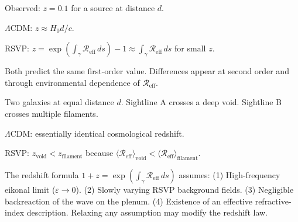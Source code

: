 \begin{WorkedExample}
  Observed: $z = 0.1$ for a source at distance $d$.

  $\Lambda$CDM: $z \approx H_0 d/c$.

  RSVP: $z = \exp(\int_\gamma \mathcal{R}_{\mathrm{eff}}\,ds) - 1
  \approx \int_\gamma\mathcal{R}_{\mathrm{eff}}\,ds$
  for small $z$.

  Both predict the same first-order value.
  Differences appear at second order and through environmental
  dependence of $\mathcal{R}_{\mathrm{eff}}$.
\end{WorkedExample}

\begin{WorkedExample}
  Two galaxies at equal distance $d$.
  Sightline A crosses a deep void.
  Sightline B crosses multiple filaments.

  $\Lambda$CDM: essentially identical cosmological redshift.

  RSVP: $z_{\mathrm{void}} < z_{\mathrm{filament}}$ because
  $\langle\mathcal{R}_{\mathrm{eff}}\rangle_{\mathrm{void}}
  < \langle\mathcal{R}_{\mathrm{eff}}\rangle_{\mathrm{filament}}$.
\end{WorkedExample}

\begin{Assumptions}
  The redshift formula $1+z = \exp(\int_\gamma\mathcal{R}_{\mathrm{eff}}\,ds)$
  assumes:
  (1) High-frequency eikonal limit ($\varepsilon \to 0$).
  (2) Slowly varying RSVP background fields.
  (3) Negligible backreaction of the wave on the plenum.
  (4) Existence of an effective refractive-index description.
  Relaxing any assumption may modify the redshift law.
\end{Assumptions}

\begin{ProblemSet}
\end{ProblemSet}
